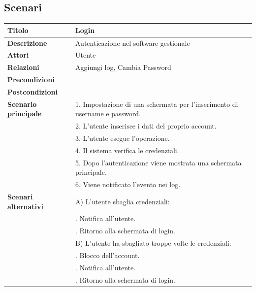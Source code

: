 \documentclass[a4paper]{article}
\begin{document}
\subsection{Scenari}


\begin{table}[ht!]
  \begin{center}
    \begin{tabulary}{1\textwidth}{l|L}
        \textbf{Titolo} & Login \\
        \hline
        \textbf{Descrizione} & Autenticazione nel software gestionale \\
        \hline
        \textbf{Attori} & Utente \\
        \hline
        \textbf{Relazioni} & Aggiungi log, Cambia Password \\
        \hline
        \textbf{Precondizioni} &  \\
        \hline
        \textbf{Postcondizioni} &  \\
        \hline
        \textbf{Scenario principale} & 1. Impostazione di una schermata per l'inserimento di username e password. \\
                                     & 2. L'utente inserisce i dati del proprio account. \\
                                     & 3. L'utente esegue l'operazione. \\
                                     & 4. Il sistema verifica le credenziali. \\
                                     & 5. Dopo l'autenticazione viene mostrata una schermata principale.\\
                                     & 6. Viene notificato l'evento nei log.\\
        \hline
        \textbf{Scenari alternativi} & A) L'utente sbaglia credenziali: \\
                                     & . Notifica all'utente.\\
                                     & . Ritorno alla schermata di login.\\
                                     & B) L'utente ha sbagliato troppe volte le credenziali: \\
                                     & . Blocco dell'account.\\
                                     & . Notifica all'utente.\\
                                     & . Ritorno alla schermata di login.\\

\end{tabulary}
\end{center}
\end{table}
\end{document}
